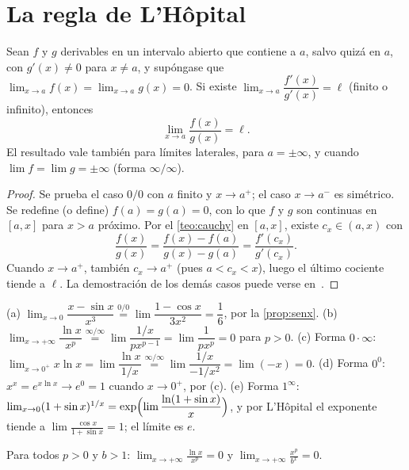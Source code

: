 \section{La regla de L'Hôpital}

\begin{teorema}\label{teo:lhopital}
Sean $f$ y $g$ derivables en un intervalo abierto que contiene a $a$, salvo quizá en $a$, con $g'(x)\ne0$ para $x\ne a$, y supóngase que $\lim_{x\to a}f(x)=\lim_{x\to a}g(x)=0$. Si existe $\lim_{x\to a}\dfrac{f'(x)}{g'(x)}=\ell$ (finito o infinito), entonces
\[
\lim_{x\to a}\frac{f(x)}{g(x)}=\ell.
\]
El resultado vale también para límites laterales, para $a=\pm\infty$, y cuando $\lim f=\lim g=\pm\infty$ (forma $\infty/\infty$).
\end{teorema}

\begin{proof}
Se prueba el caso $0/0$ con $a$ finito y $x\to a^{+}$; el caso $x\to a^{-}$ es simétrico. Se redefine (o define) $f(a)=g(a)=0$, con lo que $f$ y $g$ son continuas en $[a,x]$ para $x>a$ próximo. Por el \cref{teo:cauchy} en $[a,x]$, existe $c_x\in(a,x)$ con
\[
\frac{f(x)}{g(x)}=\frac{f(x)-f(a)}{g(x)-g(a)}=\frac{f'(c_x)}{g'(c_x)}.
\]
Cuando $x\to a^{+}$, también $c_x\to a^{+}$ (pues $a<c_x<x$), luego el último cociente tiende a $\ell$. La demostración de los demás casos puede verse en~\cite[cap.~11]{spivak}.
\end{proof}

\begin{ejemplo}\label{ej:lhopital}
(a) $\lim_{x\to0}\dfrac{x-\sin x}{x^{3}}\overset{0/0}{=}\lim\dfrac{1-\cos x}{3x^{2}}=\dfrac16$, por la \cref{prop:senx}.
(b) $\lim_{x\to+\infty}\dfrac{\ln x}{x^{p}}\overset{\infty/\infty}{=}\lim\dfrac{1/x}{px^{p-1}}=\lim\dfrac{1}{px^{p}}=0$ para $p>0$.
(c) Forma $0\cdot\infty$: $\lim_{x\to0^{+}}x\ln x=\lim\dfrac{\ln x}{1/x}\overset{\infty/\infty}{=}\lim\dfrac{1/x}{-1/x^{2}}=\lim(-x)=0$.
(d) Forma $0^{0}$: $x^{x}=e^{x\ln x}\to e^{0}=1$ cuando $x\to0^{+}$, por (c).
(e) Forma $1^{\infty}$: $\lim_{x\to0}(1+\sin x)^{1/x}=\exp\Bigl(\lim\dfrac{\ln(1+\sin x)}{x}\Bigr)$, y por L'Hôpital el exponente tiende a $\lim\frac{\cos x}{1+\sin x}=1$; el límite es $e$.
\end{ejemplo}

\begin{proposicion}\label{prop:crecimientos}
Para todos $p>0$ y $b>1$: $\displaystyle\lim_{x\to+\infty}\frac{\ln x}{x^{p}}=0$ y $\displaystyle\lim_{x\to+\infty}\frac{x^{p}}{b^{x}}=0$.
\end{proposicion}

